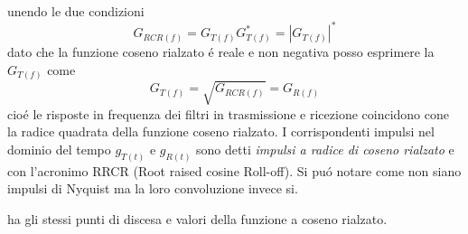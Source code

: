             unendo le due condizioni 
            \[
                G_{RCR(f)} = G_{T(f)}G_{T(f)}^\ast = \left|G_{T(f)}\right|^\ast  
            \]
            dato che la funzione coseno rialzato é reale e non negativa posso esprimere la $G_{T(f)}$ come
            \[
                G_{T(f)} = \sqrt{G_{RCR(f)}} = G_{R(f)}    
            \] 
            cioé le risposte in frequenza dei filtri in trasmissione e ricezione coincidono cone la radice
            quadrata della funzione coseno rialzato. I corrispondenti impulsi nel dominio del tempo 
            $g_{T(t)}$ e $g_{R(t)}$ sono detti \emph{impulsi a radice di coseno rialzato} e con l'acronimo RRCR
            (Root raised cosine Roll-off). Si puó notare come non siano impulsi di Nyquist ma la loro convoluzione 
            invece si.
            \begin{figure}[H]
                \centering
                \hfill
            \end{figure}           
            ha gli stessi punti di discesa e valori della funzione a coseno rialzato.

